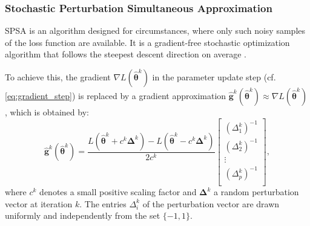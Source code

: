 \subsubsection{Stochastic Perturbation Simultaneous Approximation}
\label{sec:spsa}
\gls{SPSA} is an algorithm designed for circumstances, where only such noisy samples of the loss function are available. It is a gradient-free stochastic optimization algorithm that follows the steepest descent direction on average \cite{Spall98}. %

To achieve this, the gradient $\nabla L(\hat{\bm{\theta}}^k)$ in the parameter update step (cf. \cref{eq:gradient_step}) is replaced by a gradient approximation $\hat{\bm{g}}^k(\hat{\bm{\theta}}^k) \approx \nabla L(\hat{\bm{\theta}}^k)$, which is obtained by:
\begin{equation*}
\label{eq:spsa}
    \hat{\bm{g}}^k(\hat{\bm{\theta}}^k) = \frac{L(\hat{\bm{\theta}}^k + c^k\bm{\Delta}^k) - L(\hat{\bm{\theta}}^k - c^k\bm{\Delta}^k)}{2c^k} \begin{bmatrix}
	(\Delta^k_1)^{-1} \\
	(\Delta^k_2)^{-1} \\
	\vdots \\
	(\Delta^k_p)^{-1}\\
	\end{bmatrix},
\end{equation*}
where $c^k$ denotes a small positive scaling factor and $\bm{\Delta}^k$ a random perturbation vector at iteration \(k\).
The entries $\Delta^k_i$ of the perturbation vector are drawn uniformly and independently from the set $\{-1,1\}$.

\iffalse \cite{Spall92} gives conditions on the convergence, depending on the distribution of the perturbation vector, learning rate $\alpha^k$, scaling factor $c^k$ and the statistical relation of perturbation vector and loss function samples. \fi


